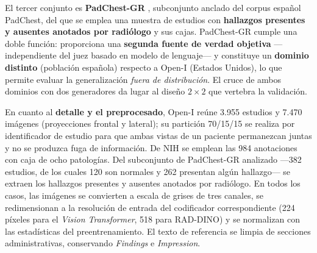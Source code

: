 El tercer conjunto es \textbf{PadChest-GR} \parencite{padchestgr2024}, subconjunto anclado del corpus
español PadChest, del que se emplea una muestra de estudios con \textbf{hallazgos presentes y ausentes
anotados por radiólogo} y sus cajas. PadChest-GR cumple una doble función: proporciona una
\textbf{segunda fuente de verdad objetiva} —independiente del juez basado en modelo de lenguaje— y
constituye un \textbf{dominio distinto} (población española) respecto a Open-I (Estados Unidos), lo
que permite evaluar la generalización \emph{fuera de distribución}. El cruce de ambos dominios con
dos generadores da lugar al diseño \(2\times2\) que vertebra la validación.

En cuanto al \textbf{detalle y el preprocesado}, Open-I reúne 3.955 estudios y 7.470 imágenes
(proyecciones frontal y lateral); su partición 70/15/15 se realiza por identificador de estudio para
que ambas vistas de un paciente permanezcan juntas y no se produzca fuga de información. De NIH se
emplean las 984 anotaciones con caja de ocho patologías. Del subconjunto de PadChest-GR analizado
—382 estudios, de los cuales 120 son normales y 262 presentan algún hallazgo— se extraen los hallazgos
presentes y ausentes anotados por radiólogo. En todos los casos, las imágenes se convierten a escala de
grises de tres canales, se redimensionan a la resolución de entrada del codificador correspondiente
(224 píxeles para el \textit{Vision Transformer}, 518 para RAD-DINO) y se normalizan con las
estadísticas del preentrenamiento. El texto de referencia se limpia de secciones administrativas,
conservando \textit{Findings} e \textit{Impression}.

